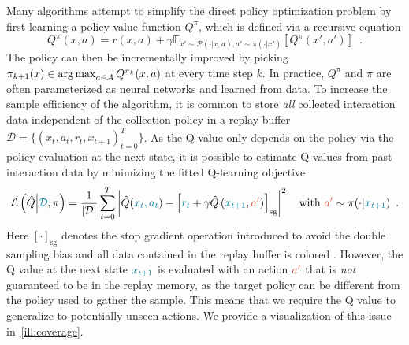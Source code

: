 Many algorithms attempt to simplify the direct policy optimization problem by first learning a policy value function $Q^\pi$, which is defined via a recursive equation%
\begin{equation*}
Q^\pi(x,a) = r(x,a) + \gamma \mathbb{E}_{x' \sim \mathcal{P}(\cdot|x,a), a' \sim \pi(\cdot|x')}\left[Q^\pi(x',a')\right]\enspace.    
\end{equation*}
The policy can then be incrementally improved by picking 
$\pi_{k+1}(x) \in \operatorname*{arg\,max}_{a \in \mathcal{A}} Q^{\pi_k}(x,a)\label{eq:pi_update}$
at every time step $k$.
In practice, $Q^\pi$ and $\pi$ are often parameterized as neural networks and learned from data. 
To increase the sample efficiency of the algorithm, it is common to store \textit{all} collected interaction data independent of the collection policy in a replay buffer $\mathcal{D} = \{(x_t, a_t, r_t, x_{t+1})_{t=0}^{T}\}$.
As the Q-value only depends on the policy via the policy evaluation at the next state, it is possible to estimate Q-values from past interaction data by minimizing the fitted Q-learning objective 
\begin{align}
\mathcal{L}\left(\hat{Q}\middle|\blue{\mathcal{D}}, \pi\right) = \frac{1}{|\mathcal{D}|} \sum_{t=0}^T \left| \hat{Q}(\blue{x_t,a_t}) - \left[\blue{r_t} + \gamma \hat{Q}\left(\blue{x_{t+1}}, \red{a'}\right)\right]_\mathrm{sg} \right|^2\quad \mathrm{with }~\red{a'}\sim \pi(\cdot|\blue{x_{t+1}}) \enspace. \label{eq:off_policy_q_update}
\end{align}
Here $[\cdot]_\mathrm{sg}$ denotes the stop gradient operation introduced to avoid the double sampling bias and all data contained in the replay buffer is colored . 
However, the Q value at the next state $\blue{x_{t+1}}$ is evaluated with an action $\red{a'}$ that is \emph{not} guaranteed to be in the replay memory, as the target policy can be different from the policy used to gather the sample.
This means that we require the Q value to generalize to potentially unseen actions.
We provide a visualization of this issue in~\autoref{ill:coverage}.

